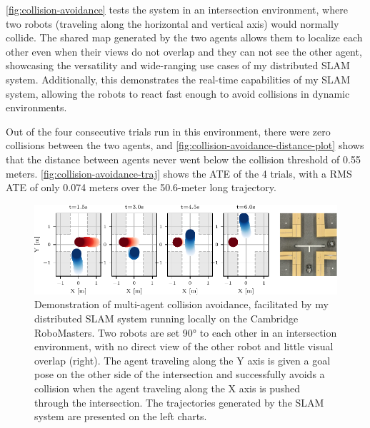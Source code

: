 \autoref{fig:collision-avoidance} tests the system in an intersection environment, where two robots (traveling along the horizontal and vertical axis) would normally collide. The shared map generated by the two agents allows them to localize each other even when their views do not overlap and they can not see the other agent, showcasing the versatility and wide-ranging use cases of my distributed SLAM system. Additionally, this demonstrates the real-time capabilities of my SLAM system, allowing the robots to react fast enough to avoid collisions in dynamic environments.

Out of the four consecutive trials run in this environment, there were zero collisions between the two agents, and \autoref{fig:collision-avoidance-distance-plot} shows that the distance between agents never went below the collision threshold of 0.55 meters. \autoref{fig:collision-avoidance-traj} shows the ATE of the 4 trials, with a RMS ATE of only 0.074 meters over the 50.6-meter long trajectory.


\begin{figure}[h]
    \centering
    \includegraphics[width=\linewidth]{figures/mar25_1_tracer_graph.pdf}

    \caption{Demonstration of multi-agent collision avoidance, facilitated by my distributed SLAM system running locally on the Cambridge RoboMasters. Two robots are set 90° to each other in an intersection environment, with no direct view of the other robot and little visual overlap (right). The agent traveling along the Y axis is given a goal pose on the other side of the intersection and successfully avoids a collision when the agent traveling along the X axis is pushed through the intersection. The trajectories generated by the SLAM system are presented on the left charts.}
    \label{fig:collision-avoidance}
\end{figure}

